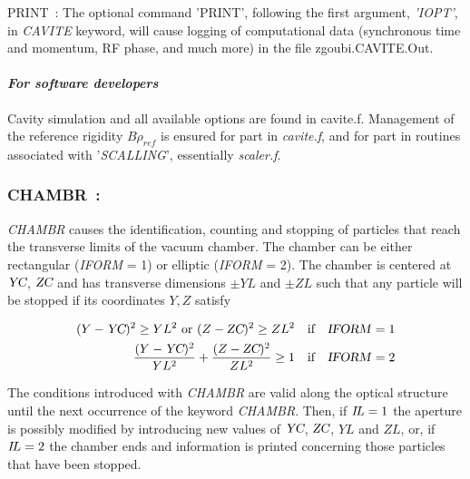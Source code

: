 {\bigskip

\noindent PRINT~: 
 The optional command 'PRINT', following the first argument, \textsl{'IOPT'}, 
in \textsl{CAVITE} keyword,  
will cause logging of computational data (synchronous time and momentum, RF phase, and much more) in the 
file zgoubi.CAVITE.Out.

\bigskip

\paragraph{\textsl{For software developers}}  

\noindent Cavity simulation and all available options are found in cavite.f. Management of the reference rigidity 
$B\rho_{ref}$ is ensured for part in \textsl{cavite.f}, and for part in routines associated with '\textsl{SCALLING}', 
essentially \textsl{scaler.f}. 




\newpage

\subsubsection*{CHAMBR~:  \CHAMBRTitl}\label{CHAMBR} 
\medskip

\textsl{CHAMBR} causes the identification, counting and stopping of 
particles that reach the 
transverse limits of the vacuum chamber.  The chamber can be either rectangular 
(\textsl{IFORM} = 1) or elliptic (\textsl{IFORM} = 2). The chamber is centered
at $ \textsl{YC}$, $\textsl{ZC} $ and has transverse dimensions $\pm YL $ and  
$\pm  ZL $ such that any particle will be stopped if its coordinates $ Y,Z $ satisfy 

\begin{align*}
	(Y-\textsl{YC})^2\geq  YL^2  \text{ or }   (Z-\textsl{ZC})^2 \geq  ZL^2 
	   &   \quad \text{if}\quad  \text{\textsl{IFORM}}=1  \\
	\dfrac{ (Y-\textsl{YC})^2 }{ YL^2} + \dfrac{(Z-\textsl{ZC})^2 }{ ZL^2} \geq 1  
	  &   \quad \text{if}\quad  \text{\textsl{IFORM}}=2  
\end{align*}

\noindent The conditions introduced with \textsl{CHAMBR} are valid
along  the optical structure until the next occurrence  of the keyword \textsl{CHAMBR}.  Then, if
$ I\!L=1 $ the aperture is possibly modified by introducing new values of $ \textsl{YC}$,  $ \textsl{ZC}$, 
 $YL $ and $ ZL $, or, if $ I\!L=2 $ the chamber ends and information is 
printed concerning those particles that have been stopped.  
\bigskip

}
